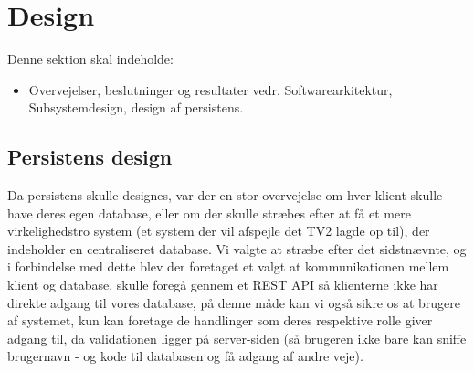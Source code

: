 \section{Design}
Denne sektion skal indeholde:

\begin{itemize}
    \item Overvejelser, beslutninger og resultater vedr. Softwarearkitektur, Subsystemdesign, design af persistens. 
\end{itemize}{}

\subsection{Persistens design}
Da persistens skulle designes, var der en stor overvejelse om hver klient skulle have deres egen database, eller om der skulle stræbes efter at få et mere virkelighedstro system (et system der vil afspejle det TV2 lagde op til), der indeholder en centraliseret database. Vi valgte at stræbe efter det sidstnævnte, og i forbindelse med dette blev der foretaget et valgt at kommunikationen mellem klient og database, skulle foregå gennem et REST API så klienterne ikke har direkte adgang til vores database, på denne måde kan vi også sikre os at brugere af systemet, kun kan foretage de handlinger som deres respektive rolle giver adgang til, da validationen ligger på server-siden (så brugeren ikke bare kan sniffe brugernavn - og kode til databasen og få adgang af andre veje).
        

        
    
